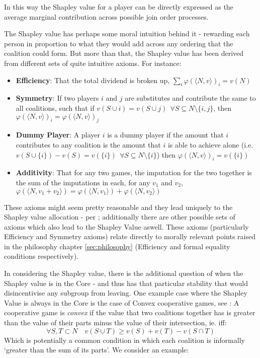 In this way the Shapley value for a player can be directly expressed as the average marginal contribution across possible join order processes.

The Shapley value has perhaps some moral intuition behind it - rewarding each person in proportion to what they would add across any ordering that the coalition could form.
But more than that, the Shapley value has been derived from different sets of quite intuitive axioms.
For instance:

\begin{itemize}
\item	\textbf{Efficiency}: That the total dividend is broken up, $\sum_i\varphi(\langle N,v\rangle)_i = v(N)$
\item	\textbf{Symmetry}: If two players $i$ and $j$ are substitutes and contribute the same to all coalitions, such that if $v(S\cup i)=v(S\cup j)~~\forall S\subseteq N\setminus\{i,j\}$, then $\varphi(\langle N,v\rangle)_i = \varphi(\langle N,v\rangle)_j$
\item	\textbf{Dummy Player}: A player $i$ is a dummy player if the amount that $i$ contributes to any coalition is the amount that $i$ is able to achieve alone (i.e.\ $v(S\cup \{i\})-v(S)=v(\{i\})~~\forall S\subseteq N\setminus\{i\}$) then $\varphi(\langle N,v\rangle)_i=v(\{i\})$
\item	\textbf{Additivity}: That for any two games, the imputation for the two together is the sum of the imputations in each, for any $v_1$ and $v_2$, $\varphi(\langle N,v_1+v_2\rangle)=\varphi(\langle N,v_1 \rangle) + \varphi(\langle N,v_2\rangle)$
\end{itemize}

These axioms might seem pretty reasonable and they lead uniquely to the Shapley value allocation - per \cite{Shapley1953a}; additionally there are other possible sets of axioms which also lead to the Shapley Value aswell.
These axioms (particularly Efficiency and Symmetry axioms) relate directly to morally relevant points raised in the philosophy chapter \ref{sec:philosophy} (Efficiency and formal equality conditions respectively).

In considering the Shapley value, there is the additional question of when the Shapley value is in the Core - and thus has that particular stability that would disincentivise any subgroup from leaving.
One example case where the Shapley Value is always in the Core is the case of Convex cooperative games, see \cite[Chapter 6]{RePEc:cup:cbooks:9781107691322}:
A cooperative game is \textit{convex} if the value that two coalitions together has is greater than the value of their parts minus the value of their intersection, ie. iff:
\begin{equation}
    \forall S,T\subset N \quad v(S\cup T) \ge v(S)+v(T)-v(S\cap T)
\end{equation}
Which is potentially a common condition in which each coalition is informally `greater than the sum of its parts'.
We consider an example:

